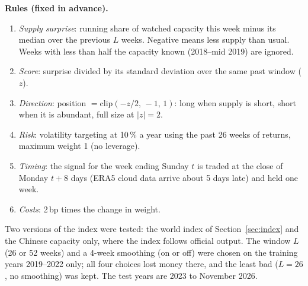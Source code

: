 \documentclass[10pt,a4paper]{article}
\begin{document}
\textbf{Rules (fixed in advance).}
\begin{enumerate}[leftmargin=1.4em,itemsep=1pt]
  \item \emph{Supply surprise}: running share of watched capacity this week minus its median over the previous $L$ weeks. Negative means less supply than usual. Weeks with less than half the capacity known (2018--mid 2019) are ignored.
  \item \emph{Score}: surprise divided by its standard deviation over the same past window ($z$).
  \item \emph{Direction}: position $=\mathrm{clip}(-z/2,\,-1,\,1)$: long when supply is short, short when it is abundant, full size at $|z|=2$.
  \item \emph{Risk}: volatility targeting at 10\,\% a year using the past 26 weeks of returns, maximum weight 1 (no leverage).
  \item \emph{Timing}: the signal for the week ending Sunday $t$ is traded at the close of Monday $t+8$ days (ERA5 cloud data arrive about 5 days late) and held one week.
  \item \emph{Costs}: 2\,bp times the change in weight.
\end{enumerate}
Two versions of the index were tested: the world index of Section~\ref{sec:index} and the Chinese capacity only, where the index follows official output. The window $L$ (26 or 52 weeks) and a 4-week smoothing (on or off) were chosen on the training years 2019--2022 only; all four choices lost money there, and the least bad ($L=26$, no smoothing) was kept. The test years are 2023 to November 2026.
\end{document}
